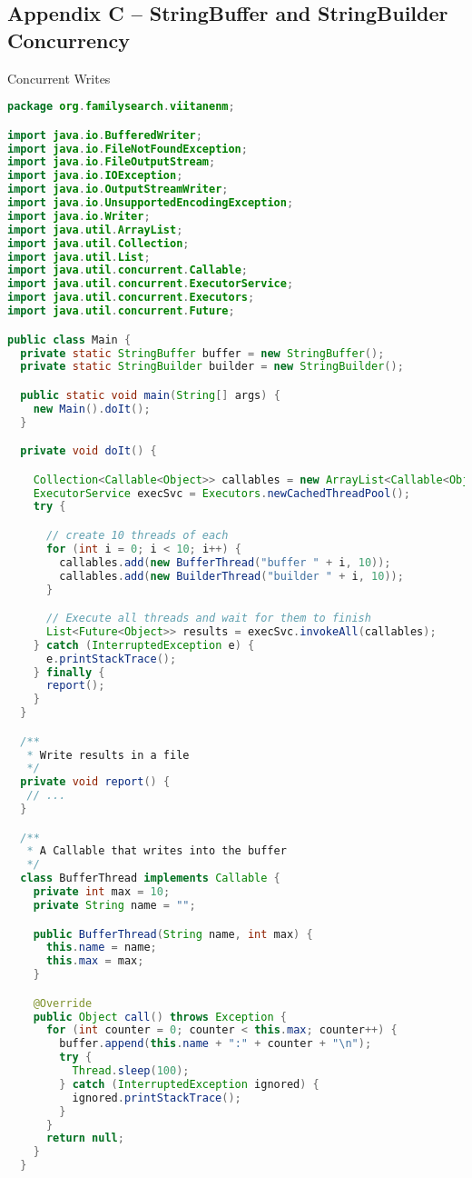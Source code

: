 \subsection*{Appendix C -- StringBuffer and StringBuilder Concurrency} \label{App:AppendixC}
Concurrent Writes
\begin{lstlisting}[language=Java]
package org.familysearch.viitanenm;

import java.io.BufferedWriter;
import java.io.FileNotFoundException;
import java.io.FileOutputStream;
import java.io.IOException;
import java.io.OutputStreamWriter;
import java.io.UnsupportedEncodingException;
import java.io.Writer;
import java.util.ArrayList;
import java.util.Collection;
import java.util.List;
import java.util.concurrent.Callable;
import java.util.concurrent.ExecutorService;
import java.util.concurrent.Executors;
import java.util.concurrent.Future;

public class Main {
  private static StringBuffer buffer = new StringBuffer();
  private static StringBuilder builder = new StringBuilder();

  public static void main(String[] args) {
    new Main().doIt();
  }

  private void doIt() {

    Collection<Callable<Object>> callables = new ArrayList<Callable<Object>>();
    ExecutorService execSvc = Executors.newCachedThreadPool();
    try {

      // create 10 threads of each
      for (int i = 0; i < 10; i++) {
        callables.add(new BufferThread("buffer " + i, 10));
        callables.add(new BuilderThread("builder " + i, 10));
      }

      // Execute all threads and wait for them to finish
      List<Future<Object>> results = execSvc.invokeAll(callables);
    } catch (InterruptedException e) {
      e.printStackTrace();
    } finally {
      report();
    }
  }

  /**
   * Write results in a file
   */
  private void report() {
   // ...
  }

  /**
   * A Callable that writes into the buffer
   */
  class BufferThread implements Callable {
    private int max = 10;
    private String name = "";

    public BufferThread(String name, int max) {
      this.name = name;
      this.max = max;
    }

    @Override
    public Object call() throws Exception {
      for (int counter = 0; counter < this.max; counter++) {
        buffer.append(this.name + ":" + counter + "\n");
        try {
          Thread.sleep(100);
        } catch (InterruptedException ignored) {
          ignored.printStackTrace();
        }
      }
      return null;
    }
  }
  

\end{lstlisting}
